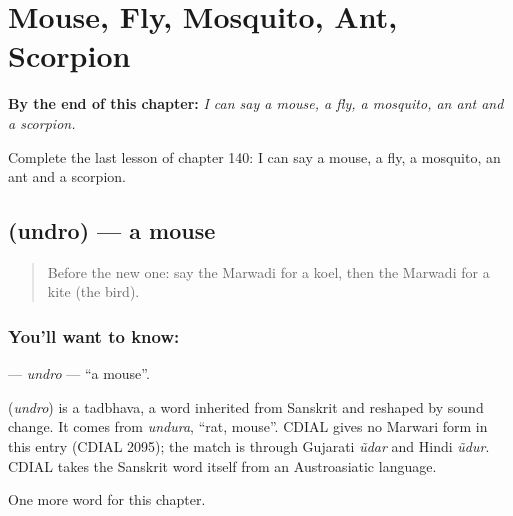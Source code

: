 
\chapter{Mouse, Fly, Mosquito, Ant, Scorpion}
\label{ch:mw-mouse-fly-mosquito-ant-scorpion}

\begin{chapteropening}
\textbf{By the end of this chapter:} \emph{I can say a mouse, a fly, a mosquito, an ant and a scorpion.}

Complete the last lesson of chapter 140: I can say a mouse, a fly, a mosquito, an ant and a scorpion.
\end{chapteropening}

\section[\texorpdfstring{\mw{उंदरो} (undro)}{उंदरो (undro)}]{ (undro) — a mouse}

\label{lesson:MW-C140-undro}



\begin{quote}
Before the new one: say the Marwadi for a koel, then the Marwadi for a kite (the bird).
\end{quote}

\subsection*{You'll want to know: }
\textbf{} — \emph{undro} — \textquotedblleft{}a mouse\textquotedblright{}.

\begin{cousinweb}
\textbf{} (\emph{undro}) is a tadbhava, a word inherited from Sanskrit and reshaped by sound change. It comes from \emph{undura}, \textquotedblleft{}rat, mouse\textquotedblright{}. CDIAL gives no Marwari form in this entry (CDIAL 2095); the match is through Gujarati \emph{ũdar} and Hindi \emph{ũdur}. CDIAL takes the Sanskrit word itself from an Austroasiatic language.
\end{cousinweb}

\begin{grammarlens}[title={What you've built}]
One more word for this chapter.
\end{grammarlens}

